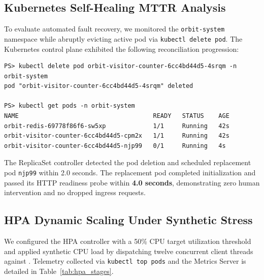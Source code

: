 \documentclass[conference]{IEEEtran}
\begin{document}
\subsection{Kubernetes Self-Healing MTTR Analysis}
To evaluate automated fault recovery, we monitored the \texttt{orbit-system} namespace while abruptly evicting active pod  via \texttt{kubectl delete pod}. The Kubernetes control plane exhibited the following reconciliation progression:
\begin{lstlisting}[style=ieeecode]
PS> kubectl delete pod orbit-visitor-counter-6cc4bd44d5-4srqm -n orbit-system
pod "orbit-visitor-counter-6cc4bd44d5-4srqm" deleted

PS> kubectl get pods -n orbit-system
NAME                                     READY   STATUS    AGE
orbit-redis-69778f86f6-sw5xp             1/1     Running   42s
orbit-visitor-counter-6cc4bd44d5-cpm2x   1/1     Running   42s
orbit-visitor-counter-6cc4bd44d5-njp99   0/1     Running   4s
\end{lstlisting}
The ReplicaSet controller detected the pod deletion and scheduled replacement pod \texttt{njp99} within 2.0 seconds. The replacement pod completed initialization and passed its HTTP readiness probe within \textbf{4.0 seconds}, demonstrating zero human intervention and no dropped ingress requests.

\subsection{HPA Dynamic Scaling Under Synthetic Stress}
We configured the HPA controller with a 50\% CPU target utilization threshold and applied synthetic CPU load by dispatching twelve concurrent client threads against . Telemetry collected via \texttt{kubectl top pods} and the Metrics Server is detailed in Table~\ref{tab:hpa_stages}.

\begin{table}[htbp]
\centering
\caption{Measured HPA Scaling Progression Under Load}
\label{tab:hpa_stages}
\end{table}
\end{document}
